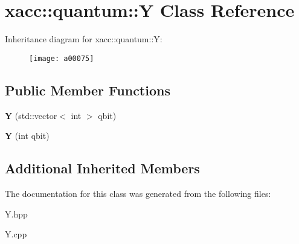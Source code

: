 \hypertarget{a00075}{}\section{xacc\+:\+:quantum\+:\+:Y Class Reference}
\label{a00075}
Inheritance diagram for xacc\+:\+:quantum\+:\+:Y\+:\begin{figure}[H]
\begin{center}
\leavevmode
\texttt{[image: a00075]}
\end{center}
\end{figure}
\subsection*{Public Member Functions}
\begin{DoxyCompactItemize}
\item 
{\bfseries Y} (std\+::vector$<$ int $>$ qbit)\hypertarget{a00075_a7959be0aa8221c0b1ba445771f5ecf0a}{}\label{a00075_a7959be0aa8221c0b1ba445771f5ecf0a}

\item 
{\bfseries Y} (int qbit)\hypertarget{a00075_aea2b37ac45208cbf6a47e0074e4a9653}{}\label{a00075_aea2b37ac45208cbf6a47e0074e4a9653}

\end{DoxyCompactItemize}
\subsection*{Additional Inherited Members}


The documentation for this class was generated from the following files\+:\begin{DoxyCompactItemize}
\item 
Y.\+hpp\item 
Y.\+cpp\end{DoxyCompactItemize}
